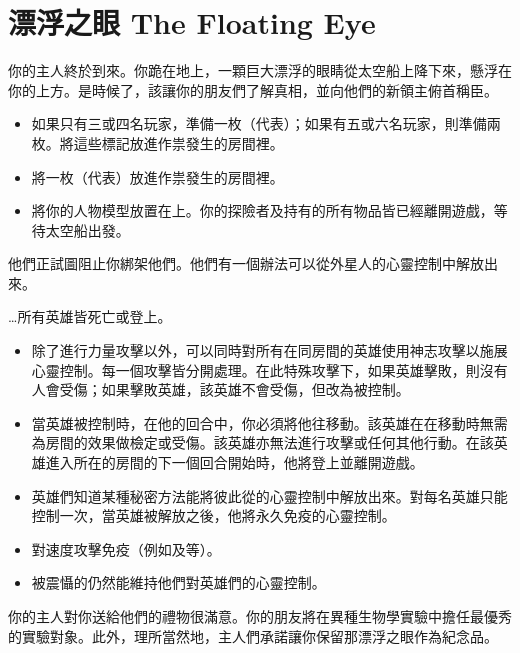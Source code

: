 
\chapter{漂浮之眼 The Floating Eye}

\begin{HauntStory}
	你的主人終於到來。你跪在地上，一顆巨大漂浮的眼睛從太空船上降下來，懸浮在你的上方。是時候了，該讓你的朋友們了解真相，並向他們的新領主俯首稱臣。
\end{HauntStory}

\vspace*{-1em}
\begin{itemize}
	\item 如果只有三或四名玩家，準備一枚（代表）；如果有五或六名玩家，則準備兩枚。將這些標記放進作祟發生的房間裡。
	\item 將一枚（代表）放進作祟發生的房間裡。
	\item 將你的人物模型放置在上。你的探險者及持有的所有物品皆已經離開遊戲，等待太空船出發。
\end{itemize}

他們正試圖阻止你綁架他們。他們有一個辦法可以從外星人的心靈控制中解放出來。

…所有英雄皆死亡或登上。

\vfill\null\pagebreak


\vspace*{-1em}
\begin{itemize}
	\item 除了進行力量攻擊以外，可以同時對所有在同房間的英雄使用神志攻擊以施展心靈控制。每一個攻擊皆分開處理。在此特殊攻擊下，如果英雄擊敗，則沒有人會受傷；如果擊敗英雄，該英雄不會受傷，但改為被控制。
	\item 當英雄被控制時，在他的回合中，你必須將他往移動。該英雄在在移動時無需為房間的效果做檢定或受傷。該英雄亦無法進行攻擊或任何其他行動。在該英雄進入所在的房間的下一個回合開始時，他將登上並離開遊戲。
	\item 英雄們知道某種秘密方法能將彼此從的心靈控制中解放出來。對每名英雄只能控制一次，當英雄被解放之後，他將永久免疫的心靈控制。
	\item {}對速度攻擊免疫（例如及等）。
	\item 被震懾的仍然能維持他們對英雄們的心靈控制。
\end{itemize}

\begin{HauntStory}
	你的主人對你送給他們的禮物很滿意。你的朋友將在異種生物學實驗中擔任最優秀的實驗對象。此外，理所當然地，主人們承諾讓你保留那漂浮之眼作為紀念品。
\end{HauntStory}
